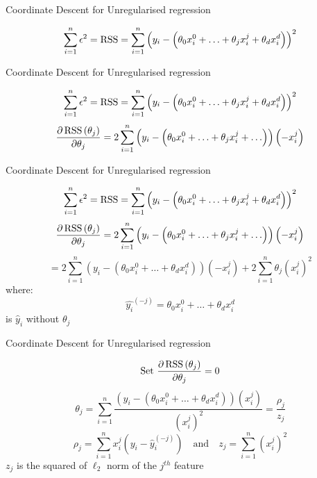 \documentclass{beamer}
\begin{document}
\begin{frame}{Coordinate Descent for Unregularised regression}

\[
\sum_{i=1}^{n}  \epsilon^{2}=\operatorname{RSS} =\sum_{i=1}^{n}\left(y_{i}-\left(\theta_{0}x_{i}^{0}+\ldots + \theta_{j} x_{i}^{j}+\theta_{d} x_{i}^{d}\right)\right)^{2}
\]
\end{frame}

\begin{frame}{Coordinate Descent for Unregularised regression}

\[
\sum_{i=1}^{n}  \epsilon^{2}=\operatorname{RSS} =\sum_{i=1}^{n}\left(y_{i}-\left(\theta_{0}x_{i}^{0}+\ldots + \theta_{j} x_{i}^{j}+\theta_{d} x_{i}^{d}\right)\right)^{2}
\]
\[
\frac{\partial \operatorname{RSS}\left(\theta_{j}\right)}{\partial \theta_{j}}= 2 \sum_{i=1}^{n}\left(y_{i}-\left(\theta_{0}x_{i}^{0}+\ldots + \theta_{j} x_{i}^{j}+\ldots \right)\right)\left(-x_{i}^{j}\right)
\]
\end{frame}

\begin{frame}{Coordinate Descent for Unregularised regression}

\[
\sum_{i=1}^{n}  \epsilon^{2}=\operatorname{RSS} =\sum_{i=1}^{n}\left(y_{i}-\left(\theta_{0}x_{i}^{0}+\ldots + \theta_{j} x_{i}^{j}+\theta_{d} x_{i}^{d}\right)\right)^{2}
\]
\[
\frac{\partial \operatorname{RSS}\left(\theta_{j}\right)}{\partial \theta_{j}}= 2 \sum_{i=1}^{n}\left(y_{i}-\left(\theta_{0}x_{i}^{0}+\ldots + \theta_{j} x_{i}^{j}+\ldots \right)\right)\left(-x_{i}^{j}\right)
\]
\[
=2\sum_{i=1}^{n}\left(y_{i}-\left(\theta_{0} x_{i}^{0}+\ldots + \theta_{d} x_{i}^{d}\right)\right)\left(-x_{i}^{j}\right)+2 \sum_{i=1}^{n} \theta_{j}(x_{i}^j)^2
\]
\pause where: $$\hat{y_{i}}^{(-j)} = \theta_{0} x_{i}^{0}+\ldots + \theta_{d} x_{i}^{d}$$ is $\hat{y}_{i}$ without $\theta_{j}$
\end{frame}

\begin{frame}{Coordinate Descent for Unregularised regression}

\[
\text{Set } \frac{\partial \operatorname{RSS}\left(\theta_{j}\right)}{\partial \theta_{j}}= 0
\]
\[
\theta_{j}=\sum_{i=1}^{n} \frac{\left(y_{i}-\left(\theta_{0} x_{i}^{0}+\ldots + \theta_{d} x_{i}^{d}\right)\right)\left(x_{i}^{j}\right)}{\left(x_{i}^{j}\right)^{2}}= \frac{\rho_{j}}{z_{j}}
\]
\[
\rho_{j} =\sum_{i=1}^{n} x_{i}^{j}\left(y_{i}-{\hat{y}_{i}^{(-j)}}\right) \quad \text{and} \quad z_{j}=\sum_{i=1}^{n}\left(x_{i}^{j}\right)^{2}
\]
$z_{j}$ is the squared of $\ell_2$ norm of the $j^{th}$ feature
\end{frame}
\end{document}
